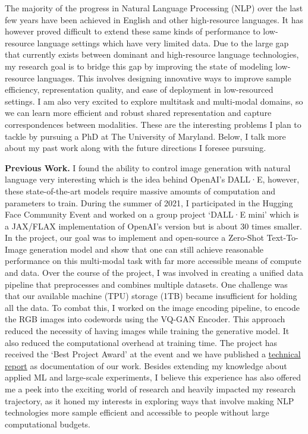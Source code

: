 \documentclass[a4paper]{article}
\author{Personal Statement, Department of Computer Science: Khalid Saifullah}
\date{\href{khalidsaifullaah.github.io}{khalidsaifullaah.github.io}}
\begin{document}
  \maketitle%

\large
\vspace{.1 in}
\noindent The majority of the progress in Natural Language Processing (NLP) over the last few years have been achieved in English and other high-resource languages. It has however proved difficult to extend these same kinds of performance to low-resource language settings which have very limited data. Due to the large gap that currently exists between dominant and high-resource language technologies, my research goal is to bridge this gap by improving the state of modeling low-resource languages. This involves designing innovative ways to improve sample efficiency, representation quality, and ease of deployment in low-resourced settings. I am also very excited to explore multitask and multi-modal domains, so we can learn more efficient and robust shared representation and capture correspondences between modalities. These are the interesting problems I plan to tackle by pursuing a PhD at The University of Maryland. Below, I talk more about my past work along with the future directions I foresee pursuing.

\vspace{.2 in}

\noindent \textbf{Previous Work.} I found the ability to control image generation with natural language very interesting which is the idea behind OpenAI’s DALL·E, however, these state-of-the-art models require massive amounts of computation and parameters to train. During the summer of 2021, I participated in the Hugging Face Community Event and worked on a group project `DALL·E mini' \cite{DALLEmini} which is a JAX/FLAX implementation of OpenAI’s version but is about 30 times smaller. In the project, our goal was to implement and open-source a Zero-Shot Text-To-Image generation model and show that one can still achieve reasonable performance on this multi-modal task with far more accessible means of compute and data. Over the course of the project, I was involved in creating a unified data pipeline that preprocesses and combines multiple datasets. One challenge was that our available machine (TPU) storage (1TB) became insufficient for holding all the data. To combat this, I  worked on the image encoding pipeline, to encode the RGB images into codewords using the VQ-GAN Encoder. This approach reduced the necessity of having images while training the generative model. It also reduced the computational overhead at training time. The project has received the ‘Best Project Award’ at the event and we have published a \href{https://wandb.ai/dalle-mini/dalle-mini/reports/DALL-E-mini--Vmlldzo4NjIxODA}{technical report} as documentation of our work. Besides extending my knowledge about applied ML and large-scale experiments, I believe this experience has also offered me a peek into the exciting world of research and heavily impacted my research trajectory, as it honed my interests in exploring ways that involve making NLP technologies more sample efficient and accessible to people without large computational budgets.
\end{document}

